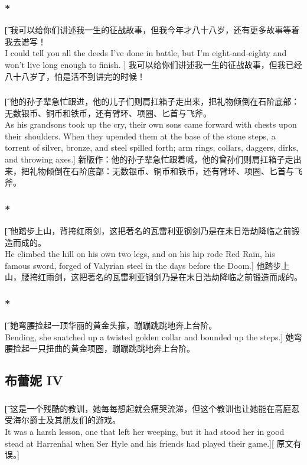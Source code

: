 \documentclass[12pt,a4paper]{article}
\begin{document}
\subsubsection{\color{red}*}\t[
	我可以给你们讲述我一生的征战故事，但我今年才八十八岁，还有更多故事等着我去谱写！\\
	I could tell you all the deeds I've done in battle, but I'm eight-and-eighty and won't live long enough to finish. ]
	我可以给你们讲述我一生的征战故事，但我已经八十八岁了，怕是活不到讲完的时候！
	
\subsubsection{}\t[
	他的孙子辈急忙跟进，他的儿子们则肩扛箱子走出来，把礼物倾倒在石阶底部：无数银币、铜币和铁币，还有臂环、项圈、匕首与飞斧。\\
	As his grandsons took up the cry, their own sons came forward with chests upon their shoulders. When they upended them at the base of the stone steps, a torrent of silver, bronze, and steel spilled forth; arm rings, collars, daggers, dirks, and throwing axes.]
	新版作：他的孙子辈急忙跟着喊，他的曾孙们则肩扛箱子走出来，把礼物倾倒在石阶底部：无数银币、铜币和铁币，还有臂环、项圈、匕首与飞斧。
	
\subsubsection{\color{red}*}\t[
	他踏步上山，背挎红雨剑，这把著名的瓦雷利亚钢剑乃是在末日浩劫降临之前锻造而成的。\\
	He climbed the hill on his own two legs, and on his hip rode Red Rain, his famous sword, forged of Valyrian steel in the days before the Doom.]
	他踏步上山，腰挎红雨剑，这把著名的瓦雷利亚钢剑乃是在末日浩劫降临之前锻造而成的。	
	
\subsubsection{\color{red}*}\t[
	她弯腰捡起一顶华丽的黄金头箍，蹦蹦跳跳地奔上台阶。\\
	Bending, she snatched up a twisted golden collar and bounded up the steps.]
	她弯腰捡起一只扭曲的黄金项圈，蹦蹦跳跳地奔上台阶。
	
\subsection{布蕾妮 IV}
\subsubsection{}\t[
	这是一个残酷的教训，她每每想起就会痛哭流涕，但这个教训也让她能在高庭忍受海尔爵士及其朋友们的游戏。\\
	It was a harsh lesson, one that left her weeping, but it had stood her in good stead at Harrenhal when Ser Hyle and his friends had played their game.][
	原文有误。]
	
\end{document}
